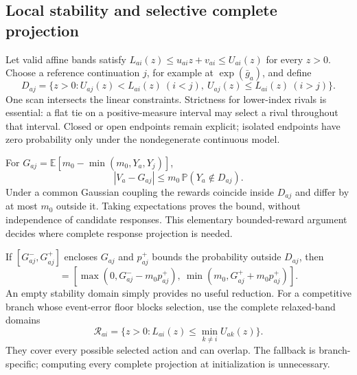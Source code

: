 \subsection{Local stability and selective complete projection}

Let valid affine bands satisfy $L_{ai}(z)\le u_{ai}z+v_{ai}\le U_{ai}(z)$ for every $z>0$. Choose a reference continuation $j$, for example at $\exp(\bar g_a)$, and define
\begin{equation}
D_{aj}=\{z>0: U_{aj}(z)<L_{ai}(z)\ (i<j),\
                 U_{aj}(z)\le L_{ai}(z)\ (i>j)\}. \label{eq:positive_stability}
\end{equation}
One scan intersects the linear constraints. Strictness for lower-index rivals is essential: a flat tie on a positive-measure interval may select a rival throughout that interval. Closed or open endpoints remain explicit; isolated endpoints have zero probability only under the nondegenerate continuous model.

For $G_{aj}=\mathbb E[m_0-\min(m_0,Y_a,Y_j)]$,
\begin{equation}
|V_a-G_{aj}|\le m_0\,\mathbb P(Y_a\notin D_{aj}).   \label{eq:positive_event}
\end{equation}
Under a common Gaussian coupling the rewards coincide inside $D_{aj}$ and differ by at most $m_0$ outside it. Taking expectations proves the bound, without independence of candidate responses. This elementary bounded-reward argument decides where complete response projection is needed.

If $[G^-_{aj},G^+_{aj}]$ encloses $G_{aj}$ and $p^+_{aj}$ bounds the probability outside $D_{aj}$, then
\begin{equation}
[\underline V_a,\overline V_a]=
[\max(0,G^-_{aj}-m_0p^+_{aj}),\
 \min(m_0,G^+_{aj}+m_0p^+_{aj})].                 \label{eq:positive_local_value}
\end{equation}
An empty stability domain simply provides no useful reduction. For a competitive branch whose event-error floor blocks selection, use the complete relaxed-band domains
\begin{equation}
\mathcal R_{ai}=\{z>0:L_{ai}(z)\le
                       \min_{k\ne i}U_{ak}(z)\}.  \label{eq:positive_projection}
\end{equation}
They cover every possible selected action and can overlap. The fallback is branch-specific; computing every complete projection at initialization is unnecessary.



